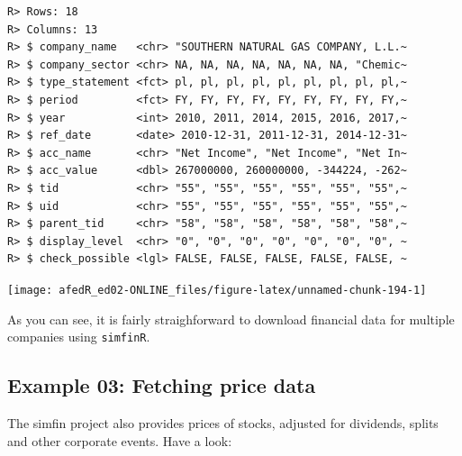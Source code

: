\documentclass[
  12pt,
]{book}
\newenvironment{Shaded}{\begin{snugshade}}{\end{snugshade}}
\newcommand{\DataTypeTok}[1]{\textcolor[rgb]{0.27,0.27,0.27}{#1}}
\newcommand{\DecValTok}[1]{\textcolor[rgb]{0.06,0.06,0.06}{#1}}
\newcommand{\KeywordTok}[1]{\textcolor[rgb]{0.27,0.27,0.27}{\textbf{#1}}}
\newcommand{\NormalTok}[1]{#1}
\newcommand{\OperatorTok}[1]{\textcolor[rgb]{0.43,0.43,0.43}{\textbf{#1}}}
\newcommand{\StringTok}[1]{\textcolor[rgb]{0.5,0.5,0.5}{#1}}
\begin{document}
\begin{verbatim}
R> Rows: 18
R> Columns: 13
R> $ company_name   <chr> "SOUTHERN NATURAL GAS COMPANY, L.L.~
R> $ company_sector <chr> NA, NA, NA, NA, NA, NA, NA, "Chemic~
R> $ type_statement <fct> pl, pl, pl, pl, pl, pl, pl, pl, pl,~
R> $ period         <fct> FY, FY, FY, FY, FY, FY, FY, FY, FY,~
R> $ year           <int> 2010, 2011, 2014, 2015, 2016, 2017,~
R> $ ref_date       <date> 2010-12-31, 2011-12-31, 2014-12-31~
R> $ acc_name       <chr> "Net Income", "Net Income", "Net In~
R> $ acc_value      <dbl> 267000000, 260000000, -344224, -262~
R> $ tid            <chr> "55", "55", "55", "55", "55", "55",~
R> $ uid            <chr> "55", "55", "55", "55", "55", "55",~
R> $ parent_tid     <chr> "58", "58", "58", "58", "58", "58",~
R> $ display_level  <chr> "0", "0", "0", "0", "0", "0", "0", ~
R> $ check_possible <lgl> FALSE, FALSE, FALSE, FALSE, FALSE, ~
\end{verbatim}

\begin{center}\texttt{[image: afedR\_ed02-ONLINE\_files/figure-latex/unnamed-chunk-194-1]} \end{center}

As you can see, it is fairly straighforward to download financial data for multiple companies using \texttt{simfinR}.

\hypertarget{example-03-fetching-price-data}{%
\subsection{Example 03: Fetching price data}\label{example-03-fetching-price-data}}

The simfin project also provides prices of stocks, adjusted for dividends, splits and other corporate events. Have a look:

\begin{Shaded}
\end{Shaded}
\end{document}
